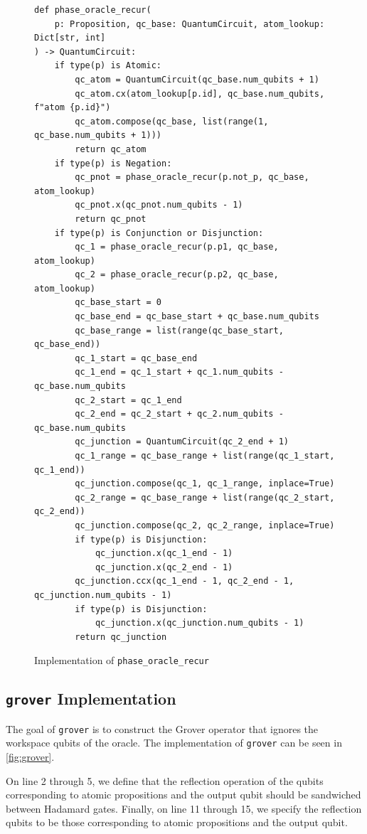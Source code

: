 \begin{figure}[H]
\centering
\begin{verbatim}
def phase_oracle_recur(
    p: Proposition, qc_base: QuantumCircuit, atom_lookup: Dict[str, int]
) -> QuantumCircuit:
    if type(p) is Atomic:
        qc_atom = QuantumCircuit(qc_base.num_qubits + 1)
        qc_atom.cx(atom_lookup[p.id], qc_base.num_qubits, f"atom {p.id}")
        qc_atom.compose(qc_base, list(range(1, qc_base.num_qubits + 1)))
        return qc_atom
    if type(p) is Negation:
        qc_pnot = phase_oracle_recur(p.not_p, qc_base, atom_lookup)
        qc_pnot.x(qc_pnot.num_qubits - 1)
        return qc_pnot
    if type(p) is Conjunction or Disjunction:
        qc_1 = phase_oracle_recur(p.p1, qc_base, atom_lookup)
        qc_2 = phase_oracle_recur(p.p2, qc_base, atom_lookup)
        qc_base_start = 0
        qc_base_end = qc_base_start + qc_base.num_qubits
        qc_base_range = list(range(qc_base_start, qc_base_end))
        qc_1_start = qc_base_end
        qc_1_end = qc_1_start + qc_1.num_qubits - qc_base.num_qubits
        qc_2_start = qc_1_end
        qc_2_end = qc_2_start + qc_2.num_qubits - qc_base.num_qubits
        qc_junction = QuantumCircuit(qc_2_end + 1)
        qc_1_range = qc_base_range + list(range(qc_1_start, qc_1_end))
        qc_junction.compose(qc_1, qc_1_range, inplace=True)
        qc_2_range = qc_base_range + list(range(qc_2_start, qc_2_end))
        qc_junction.compose(qc_2, qc_2_range, inplace=True)
        if type(p) is Disjunction:
            qc_junction.x(qc_1_end - 1)
            qc_junction.x(qc_2_end - 1)
        qc_junction.ccx(qc_1_end - 1, qc_2_end - 1, qc_junction.num_qubits - 1)
        if type(p) is Disjunction:
            qc_junction.x(qc_junction.num_qubits - 1)
        return qc_junction
\end{verbatim}
\caption{Implementation of \texttt{phase\_oracle\_recur} }
\label{fig:phase_oracle_recur}
\end{figure}

\subsection{\texttt{grover} Implementation}\label{subsec:grover-implementation}

The goal of \texttt{grover} is to construct the Grover operator that ignores the workspace qubits of the oracle.
The implementation of \texttt{grover} can be seen in \autoref{fig:grover}.

On line 2 through 5, we define that the reflection operation of the qubits corresponding to atomic propositions and the output qubit should be sandwiched between Hadamard gates.
Finally, on line 11 through 15, we specify the reflection qubits to be those corresponding to atomic propositions and the output qubit.


